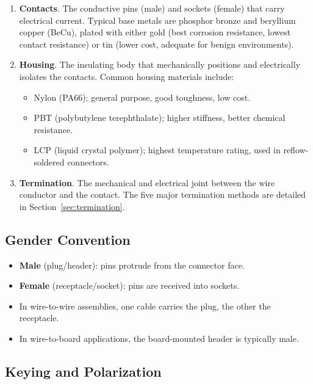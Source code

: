 \documentclass[11pt,letterpaper,twoside,openany]{book}
\begin{document}
\begin{enumerate}[leftmargin=1.5em]
  \item \textbf{Contacts}. The conductive pins (male) and sockets (female) that carry electrical current. Typical base metals are phosphor bronze and beryllium copper (BeCu), plated with either gold (best corrosion resistance, lowest contact resistance) or tin (lower cost, adequate for benign environments).

  \item \textbf{Housing}. The insulating body that mechanically positions and electrically isolates the contacts. Common housing materials include:
  \begin{itemize}[nosep]
    \item Nylon (PA66); general purpose, good toughness, low cost.
    \item PBT (polybutylene terephthalate); higher stiffness, better chemical resistance.
    \item LCP (liquid crystal polymer); highest temperature rating, used in reflow-soldered connectors.
  \end{itemize}

  \item \textbf{Termination}. The mechanical and electrical joint between the wire conductor and the contact. The five major termination methods are detailed in Section~\ref{sec:termination}.
\end{enumerate}

\subsection{Gender Convention}

\begin{itemize}[leftmargin=1.5em]
  \item \textbf{Male} (plug/header): pins protrude from the connector face.
  \item \textbf{Female} (receptacle/socket): pins are received into sockets.
  \item In wire-to-wire assemblies, one cable carries the plug, the other the receptacle.
  \item In wire-to-board applications, the board-mounted header is typically male.
\end{itemize}

\subsection{Keying and Polarization}
\end{document}
